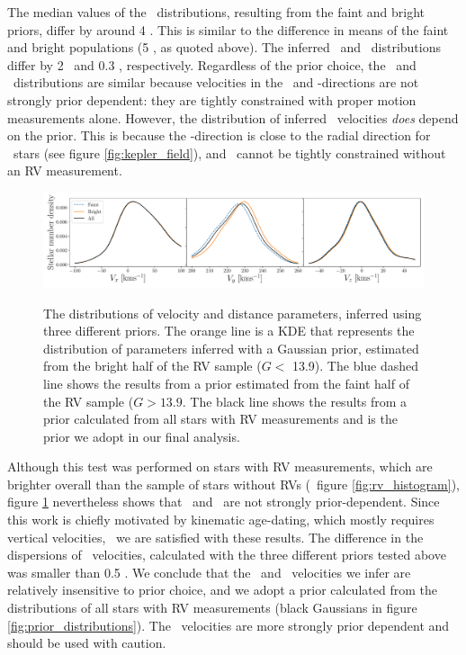 The median values of the \vy\ distributions, resulting from the faint and
bright priors, differ by around 4 \kms.
This is similar to the difference in means of the faint and bright populations
(5 \kms, as quoted above).
The inferred \vx\ and \vz\ distributions differ by 2 \kms\ and 0.3 \kms,
respectively.
Regardless of the prior choice, the \vx\ and \vz\ distributions are similar
because velocities in the \x\ and \z-directions are not strongly prior
dependent: they are tightly constrained with proper motion measurements alone.
However, the distribution of inferred \vy\ velocities {\it does} depend on the
prior.
This is because the \y-direction is close to the radial direction for \kepler\
stars (see figure \ref{fig:kepler_field}), and \vy\ cannot be tightly
constrained without an RV measurement.
\begin{figure}[ht!]
\caption{
The distributions of velocity and distance parameters, inferred using three
    different priors.
The orange line is a KDE that represents the distribution of parameters
    inferred with a Gaussian prior, estimated from the bright half of the RV
    sample ($G < $ 13.9).
The blue dashed line shows the results from a prior estimated from the faint
    half of the RV sample ($G > 13.9$.
The black line shows the results from a prior calculated from all stars with
    RV measurements and is the prior we adopt in our final analysis.
    }
  \centering
    \includegraphics[width=1\textwidth]{prior_comparison}
\label{fig:prior_comparison}
\end{figure}


Although this test was performed on stars with RV measurements, which are
brighter overall than the sample of stars without RVs (\eg\ figure
\ref{fig:rv_histogram}), figure \ref{fig:prior_comparison} nevertheless shows
that \vx\ and \vz\ are not strongly prior-dependent.
Since this work is chiefly motivated by kinematic age-dating, which mostly
requires vertical velocities, \vz\, we are satisfied with these results.
The difference in the dispersions of \vz\ velocities, calculated with the
three different priors tested above was smaller than 0.5 \kms.
We conclude that the \vx\ and \vz\ velocities we infer are relatively
insensitive to prior choice, and we adopt a prior calculated from the
distributions of all stars with RV measurements (black Gaussians in figure
\ref{fig:prior_distributions}).
The \vy\ velocities are more strongly prior dependent and should be used with
caution.
